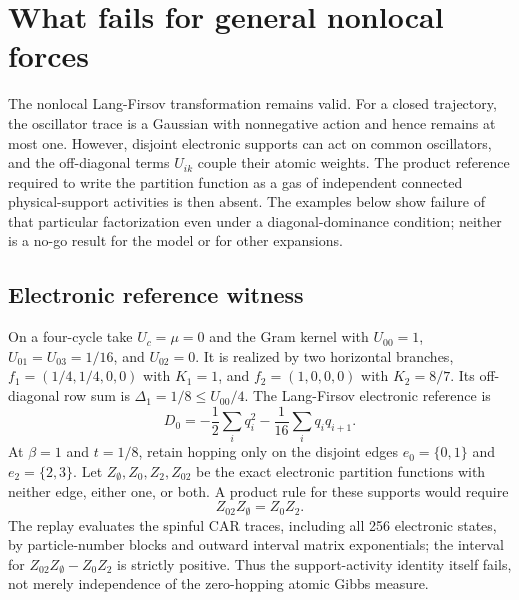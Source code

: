 \documentclass[11pt]{article}
\begin{document}
\section{What fails for general nonlocal forces}
The nonlocal Lang-Firsov transformation remains valid. For a closed trajectory, the oscillator trace is a Gaussian with nonnegative action and hence remains at most one. However, disjoint electronic supports can act on common oscillators, and the off-diagonal terms $U_{ik}$ couple their atomic weights. The product reference required to write the partition function as a gas of independent connected physical-support activities is then absent. The examples below show failure of that particular factorization even under a diagonal-dominance condition; neither is a no-go result for the model or for other expansions.

\subsection{Electronic reference witness}
On a four-cycle take $U_c=\mu=0$ and the Gram kernel with $U_{00}=1$, $U_{01}=U_{03}=1/16$, and $U_{02}=0$. It is realized by two horizontal branches, $f_1=(1/4,1/4,0,0)$ with $K_1=1$, and $f_2=(1,0,0,0)$ with $K_2=8/7$. Its off-diagonal row sum is $\Delta_1=1/8\le U_{00}/4$. The Lang-Firsov electronic reference is
\[
 D_0=-\frac12\sum_iq_i^2-\frac1{16}\sum_iq_iq_{i+1}.
\]
At $\beta=1$ and $t=1/8$, retain hopping only on the disjoint edges $e_0=\{0,1\}$ and $e_2=\{2,3\}$. Let $Z_\emptyset,Z_0,Z_2,Z_{02}$ be the exact electronic partition functions with neither edge, either one, or both. A product rule for these supports would require
\[
 Z_{02}Z_\emptyset=Z_0Z_2.
\]
The replay evaluates the spinful CAR traces, including all 256 electronic states, by particle-number blocks and outward interval matrix exponentials; the interval for $Z_{02}Z_\emptyset-Z_0Z_2$ is strictly positive. Thus the support-activity identity itself fails, not merely independence of the zero-hopping atomic Gibbs measure.
\end{document}
